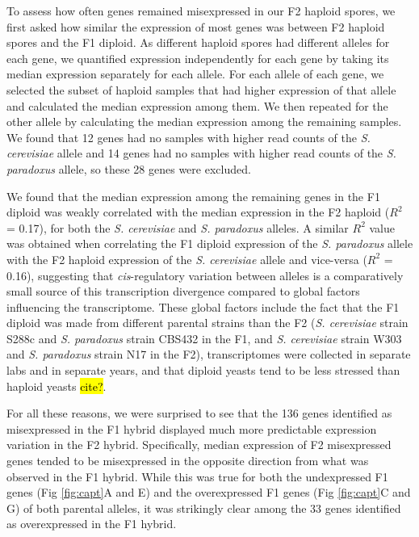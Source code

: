 To assess how often genes remained misexpressed in our F2 haploid spores, we first asked how similar the expression of most genes was between F2 haploid spores and the F1 diploid. As different haploid spores had different alleles for each gene, we quantified expression independently for each gene by taking its median expression separately for each allele. For each allele of each gene, we selected the subset of haploid samples that had higher expression of that allele and calculated the median expression among them. We then repeated for the other allele by calculating the median expression among the remaining samples. We found that 12 genes had no samples with higher read counts of the \textit{S. cerevisiae} allele and 14 genes had no samples with higher read counts of the \textit{S. paradoxus} allele, so these 28 genes were excluded.

We found that the median expression among the remaining genes in the F1 diploid was weakly correlated with the median expression in the F2 haploid ($R^2$ = 0.17), for both the \textit{S. cerevisiae} and \textit{S. paradoxus} alleles. A similar $R^2$ value was obtained when correlating the F1 diploid expression of the \textit{S. paradoxus} allele with the F2 haploid expression of the \textit{S. cerevisiae} allele and vice-versa ($R^2$ = 0.16), suggesting that \textit{cis}-regulatory variation between alleles is a comparatively small source of this transcription divergence compared to global factors influencing the transcriptome. These global factors include the fact that the F1 diploid was made from different parental strains than the F2 (\textit{S. cerevisiae} strain S288c and \textit{S. paradoxus} strain CBS432 in the F1, and \textit{S. cerevisiae} strain W303 and \textit{S. paradoxus} strain N17 in the F2), transcriptomes were collected in separate labs and in separate years, and that diploid yeasts tend to be less stressed than haploid yeasts \hl{cite?}.

For all these reasons, we were surprised to see that the 136 genes identified as misexpressed in the F1 hybrid displayed much more predictable expression variation in the F2 hybrid. Specifically, median expression of F2 misexpressed genes tended to be misexpressed in the opposite direction from what was observed in the F1 hybrid. While this was true for both the undexpressed F1 genes (Fig \ref{fig:capt}A and E) and the overexpressed F1 genes (Fig \ref{fig:capt}C and G) of both parental alleles, it was strikingly clear among the 33 genes identified as overexpressed in the F1 hybrid.

